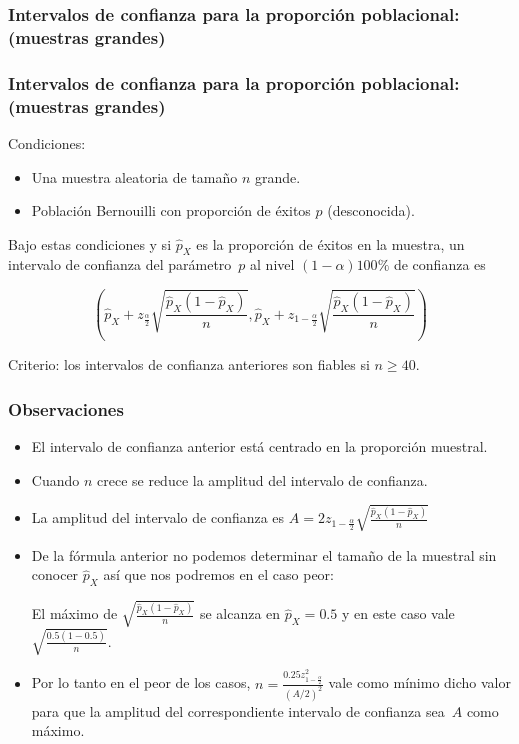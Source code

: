 \subsubsection{Intervalos de confianza para la proporción
poblacional: (muestras grandes)}
\begin{frame}
\frametitle{Intervalos de confianza para la proporción
poblacional: (muestras grandes)}

Condiciones:

\begin{itemize}
\item Una muestra aleatoria de tamaño $n$ grande.
\item Población Bernouilli con proporción de éxitos $p$ (desconocida).
\end{itemize}

Bajo estas condiciones y si $\hat{p}_{X}$ es la proporción de éxitos en la muestra, un
intervalo de confianza del parámetro~$p$ al nivel $(1-\alpha)100\%$ de confianza es


$$\left(\hat{p}_{X}+z_{\frac{\alpha}{2}}\sqrt{\frac{\hat{p}_{X} (1-\hat{p}_{X})}{n}},
\hat{p}_{X}+z_{1-\frac{\alpha}{2}}\sqrt{\frac{\hat{p}_{X} (1-\hat{p}_{X})}{n}}\right)$$


Criterio: los intervalos de confianza anteriores son fiables si $n\geq 40.$
\end{frame}

\begin{frame}
\frametitle{Observaciones}
\begin{itemize}
\item El intervalo de confianza anterior está centrado en la proporción muestral.
\item Cuando $n$ crece se reduce la amplitud del intervalo de confianza.
\item La amplitud del intervalo de confianza es
$A=2 z_{1-\frac{\alpha}{2}} \sqrt{\frac{\hat{p}_{X} (1-\hat{p}_{X})}{n}}$
\item  De la fórmula anterior no podemos determinar el tamaño de la muestral sin conocer $\hat{p}_{X}$ así que nos podremos en el caso peor:

El máximo  de
$\sqrt{\frac{\hat{p}_{X} (1-\hat{p}_{X})}{n}}$
 se alcanza en $\hat{p}_{X}=0.5$  y en este caso vale
$\sqrt{\frac{0.5(1-0.5)}{n}}.$

\item Por lo tanto en el peor de los casos,
$n=\frac{0.25 z_{1-\frac{\alpha}{2}}^2}{(A/2)^2}$ vale como mínimo dicho valor para que la amplitud del correspondiente intervalo
de confianza sea~$A$ como máximo.
\end{itemize}
\end{frame}


